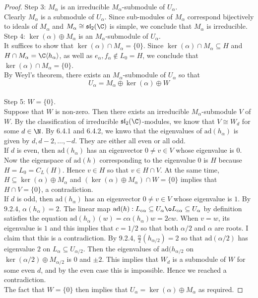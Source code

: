 \documentclass[a4paper]{article}
\begin{document}
\begin{lmm}{}{}
\begin{proof}
Step 3: $M_\alpha$ is an irreducible $M_\alpha$-submodule of $U_\alpha$. \\
Clearly $M_\alpha$ is a submodule of $U_\alpha$. Since sub-modules of $M_\alpha$ correspond bijectively to ideals of $M_\alpha$ and $M_\alpha\cong\mathfrak{sl}_2(\C)$ is simple, we conclude that $M_\alpha$ is irreducible. \\

Step 4: $\ker(\alpha)\oplus M_\alpha$ is an $M_\alpha$-submodule of $U_\alpha$. \\
It suffices to show that $\ker(\alpha)\cap M_\alpha=\{0\}$. Since $\ker(\alpha)\cap M_\alpha\subseteq H$ and $H\cap M_\alpha=\C\langle h_\alpha\rangle$, as well as $e_\alpha,f_\alpha\notin L_0=H$, we conclude that $\ker(\alpha)\cap M_\alpha=\{0\}$. \\

By Weyl's theorem, there exists an $M_\alpha$-submodule of $U_\alpha$ so that $$U_\alpha=M_\alpha\oplus\ker(\alpha)\oplus W$$~\\

Step 5: $W=\{0\}$. \\
Suppose that $W$ is non-zero. Then there exists an irreducible $M_\alpha$-submodule $V$ of $W$. By the classification of irreducible $\mathfrak{sl}_2(\C)$-modules, we know that $V\cong W_d$ for some $d\in\N$. By 6.4.1 and 6.4.2, we knwo that the eigenvalues of $\text{ad}(h_\alpha)$ is given by $d,d-2,\dots,-d$. They are either all even or all odd. \\

If $d$ is even, then $\text{ad}(h_\alpha)$ has an eigenvector $0\neq v\in V$ whose eigenvalue is $0$. Now the eigenspace of $\text{ad}(h)$ corresponding to the eigenvalue $0$ is $H$ because $H=L_0=C_L(H)$. Hence $v\in H$ so that $v\in H\cap V$. At the same time, $H\subseteq\ker(\alpha)\oplus M_\alpha$ and $(\ker(\alpha)\oplus M_\alpha)\cap W=\{0\}$ implies that $H\cap V=\{0\}$, a contradiction. \\

If $d$ is odd, then $\text{ad}(h_\alpha)$ has an eigenvector $0\neq v\in V$ whose eigenvalue is $1$. By 9.2.4, $\alpha(h_\alpha)=2$. The linear map $\text{ad}(h):L_{c\alpha}\subseteq U_\alpha\o L_{c\alpha}\subseteq U_\alpha$ by definition satisfies the equation $\text{ad}(h_\alpha)(w)=c\alpha(h_\alpha)w=2cw$. When $v=w$, its eigenvalue is $1$ and this implies that $c=1/2$ so that both $\alpha/2$ and $\alpha$ are roots. I claim that this is a contradiction. By 9.2.4, $\frac{\alpha}{2}(h_{\alpha/2})=2$ so that $\text{ad}(\alpha/2)$ has eigenvalue $2$ on $L_\alpha\subseteq U_{\alpha/2}$. Then the eigenvalues of $\text{ad}(h_{\alpha/2}$ on $\ker(\alpha/2)\oplus M_{\alpha/2}$ is $0$ and $\pm2$. This implies that $W_d$ is a submodule of $W$ for some even $d$, and by the even case this is impossible. Hence we reached a contradiction. \\

The fact that $W=\{0\}$ then implies that $U_\alpha=\ker(\alpha)\oplus M_\alpha$ as required. 
\end{proof}
\end{lmm}
\end{document}
